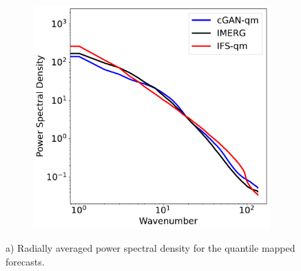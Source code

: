 \documentclass{article}
\begin{document}
\begin{figure}[!ht]
     \centering
     \begin{subfigure}{0.48\textwidth}
     \includegraphics[width=\textwidth]{images/rapsd_final-nologs_217600.pdf}
     \caption{}
     \end{subfigure}
     
     \caption{a) Radially averaged power spectral density for the quantile mapped forecasts. 
}
     \label{fig:rapsd}
\end{figure}
\end{document}
